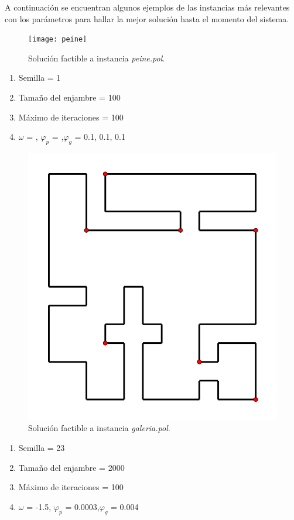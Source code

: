\documentclass[12pt]{article}
\begin{document}
A continuación se encuentran algunos ejemplos de las instancias más relevantes con los parámetros
para hallar la mejor solución hasta el momento del sistema.
\begin{multicols}{2}
\begin{figure}[H]
  \centering
  \texttt{[image: peine]}
  \caption{Solución factible a instancia \textit{peine.pol}.}
\end{figure}

\begin{enumerate}
\item Semilla = 1
\item Tamaño del enjambre = 100
\item Máximo de iteraciones = 100
\item $\omega$ = , $\varphi_p$ = ,$\varphi_g$ = 0.1, 0.1, 0.1
\end{enumerate}

\end{multicols}

\begin{multicols}{2}

\begin{figure}[H]
  \centering
  \includegraphics[width=.3\textwidth]{galeria}
  \caption{Solución factible a instancia \textit{galeria.pol}.}
\end{figure}

\begin{enumerate}
\item Semilla = 23
\item Tamaño del enjambre = 2000
\item Máximo de iteraciones = 100
\item $\omega$ = -1.5, $\varphi_p$ = 0.0003,$\varphi_g$ = 0.004 
\end{enumerate}

\end{multicols}
\end{document}
